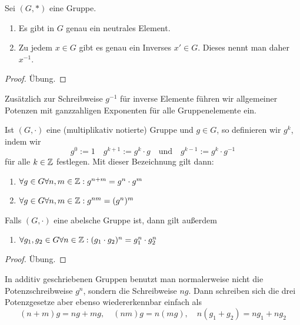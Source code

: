 \begin{lemma} \label{gruppen:eindeutig_1_inv}
Sei $(G,*)$ eine Gruppe.
\begin{enumerate}[ref=\thetheorem.\alph*]
    \item \label{gruppen:eindeutig_1}
    Es gibt in $G$ genau ein neutrales Element.
    \item \label{gruppen:eindeutig_inv}
    Zu jedem $x \in G$ gibt es genau ein Inverses $x' \in G$. Dieses nennt man daher $x^{-1}$.
\end{enumerate}
\end{lemma}
\begin{proof}
    Übung.
\end{proof}

\begin{lemmadef}[Potenzschreibweise]
    Zusätzlich zur Schreibweise $g^{-1}$ für inverse Elemente führen wir allgemeiner Potenzen mit ganzzahligen Exponenten für alle Gruppenelemente ein.

    Ist $(G,\cdot)$ eine (multiplikativ notierte) Gruppe und $g\in G$, so definieren wir $g^k$, indem wir
    \[g^0 := 1 \quad g^{k+1}:=g^k\cdot g \quad\text{und}\quad g^{k-1} := g^k \cdot g^{-1}\]
    für alle $k\in\mathbb{Z}$ festlegen. Mit dieser Bezeichnung gilt dann:
    \begin{enumerate}
        \item $\forall g\in G \forall n,m\in\mathbb{Z}: g^{n+m} = g^n \cdot g^m$
        \item $\forall g\in G \forall n,m\in\mathbb{Z}: g^{nm} = (g^n)^m$
    \end{enumerate}
    Falls $(G,\cdot)$ eine abelsche Gruppe ist, dann gilt außerdem
    \begin{enumerate}[resume]
        \item $\forall g_1,g_2\in G\forall n\in\mathbb{Z}: (g_1 \cdot g_2)^n = g_1^n \cdot g_2^n$
    \end{enumerate}
\end{lemmadef}
\begin{proof}
    Übung.
\end{proof}

\begin{remark}
    In additiv geschriebenen Gruppen benutzt man normalerweise nicht die Potenzschreibweise $g^n$, sondern die Schreibweise $ng$. Dann schreiben sich die drei Potenzgesetze aber ebenso wiedererkennbar einfach als
    \[(n+m)g = ng+mg,\quad (nm)g = n(mg),\quad n(g_1+g_2)=ng_1+ng_2\]
\end{remark}